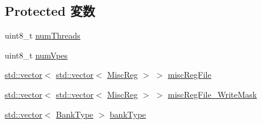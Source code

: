 \subsection*{Protected 変数}
\begin{DoxyCompactItemize}
\item 
uint8\_\-t \hyperlink{classMipsISA_1_1ISA_aa972a4ac745d8349cf6f90462dfc5433}{numThreads}
\item 
uint8\_\-t \hyperlink{classMipsISA_1_1ISA_a4ee800a76f0f2c6b285bf0881a4b6c1a}{numVpes}
\item 
\hyperlink{classstd_1_1vector}{std::vector}$<$ \hyperlink{classstd_1_1vector}{std::vector}$<$ \hyperlink{namespaceMipsISA_aa16539aa6584fd12f7d6fa868f75b4de}{MiscReg} $>$ $>$ \hyperlink{classMipsISA_1_1ISA_a02abb0f7fcd403c7ec4810a93f77ec60}{miscRegFile}
\item 
\hyperlink{classstd_1_1vector}{std::vector}$<$ \hyperlink{classstd_1_1vector}{std::vector}$<$ \hyperlink{namespaceMipsISA_aa16539aa6584fd12f7d6fa868f75b4de}{MiscReg} $>$ $>$ \hyperlink{classMipsISA_1_1ISA_a53b478f356b8709271f5f00b99473458}{miscRegFile\_\-WriteMask}
\item 
\hyperlink{classstd_1_1vector}{std::vector}$<$ \hyperlink{classMipsISA_1_1ISA_a6fe085db0aa80588322c415f46d74bf1}{BankType} $>$ \hyperlink{classMipsISA_1_1ISA_adf99e34b7a92591520cf8908417e9154}{bankType}
\end{DoxyCompactItemize}


